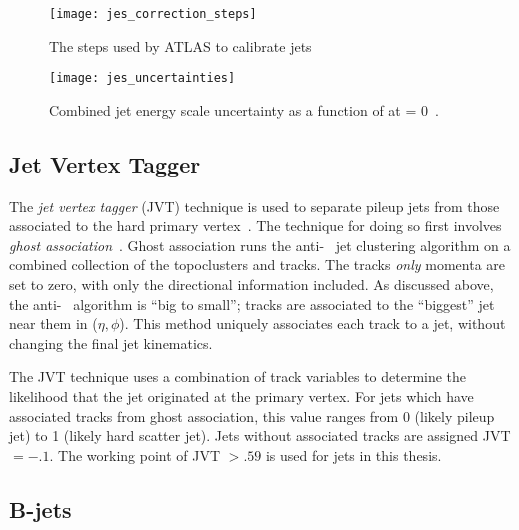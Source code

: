 \begin{figure}
\caption{The steps used by ATLAS to calibrate jets} \label{fig:jes_correction_steps}
\texttt{[image: jes\_correction\_steps]}
\end{figure}


\begin{figure}
\caption{Combined jet energy scale uncertainty as a function of \pt at \eta = 0~\cite{ATL-PHYS-PUB-2015-014,ATL-PHYS-PUB-2015-015}.} \label{fig:jes_uncertainties}
\texttt{[image: jes\_uncertainties]}
\end{figure}

\subsection{Jet Vertex Tagger}

The \textit{jet vertex tagger} (JVT) technique is used to separate pileup jets from those associated to the hard primary vertex~\cite{ATLAS-CONF-2014-018}.
The technique for doing so first involves \textit{ghost association}~\cite{Cacciari:2008gn}.
Ghost association runs the anti-\kt~ jet clustering algorithm on a combined collection of the topoclusters and tracks.
The tracks \textit{only} momenta are set to zero\footnotemark, with only the directional information included.
As discussed above, the anti-\kt~ algorithm is ``big to small'';  tracks are associated to the ``biggest'' jet near them in ($\eta, \phi$).
This method uniquely associates each track to a jet, without changing the final jet kinematics.

The JVT technique uses a combination of track variables to determine the likelihood that the jet originated at the primary vertex.
For jets which have associated tracks from ghost association, this value ranges from 0 (likely pileup jet) to 1 (likely hard scatter jet).
Jets without associated tracks are assigned JVT $= -.1$.
The  working point of JVT $ > .59$ is used for jets in this thesis.

\subsection{B-jets}

